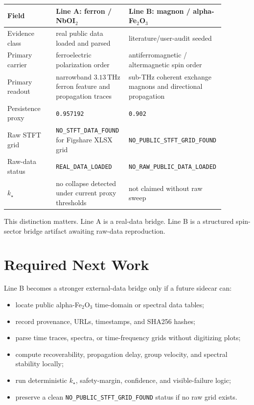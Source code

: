\documentclass[11pt]{article}
\begin{document}
\begin{longtable}{p{0.22\linewidth}p{0.33\linewidth}p{0.33\linewidth}}
\toprule
Field & Line A: ferron / NbOI$_2$ & Line B: magnon / alpha-Fe$_2$O$_3$ \\
\midrule
\endhead
Evidence class & real public data loaded and parsed & literature/user-audit seeded \\
Primary carrier & ferroelectric polarization order & antiferromagnetic / altermagnetic spin order \\
Primary readout & narrowband \(3.13\,\mathrm{THz}\) ferron feature and propagation traces & sub-THz coherent exchange magnons and directional propagation \\
Persistence proxy & \texttt{0.957192} & \texttt{0.902} \\
Raw STFT grid & \texttt{NO\_STFT\_DATA\_FOUND} for Figshare XLSX grid & \texttt{NO\_PUBLIC\_STFT\_GRID\_FOUND} \\
Raw-data status & \texttt{REAL\_DATA\_LOADED} & \texttt{NO\_RAW\_PUBLIC\_DATA\_LOADED} \\
\(k_\star\) & no collapse detected under current proxy thresholds & not claimed without raw sweep \\
\bottomrule
\end{longtable}

This distinction matters. Line A is a real-data bridge. Line B is a structured
spin-sector bridge artifact awaiting raw-data reproduction.

\section{Required Next Work}

Line B becomes a stronger external-data bridge only if a future sidecar can:

\begin{itemize}
\item locate public alpha-Fe$_2$O$_3$ time-domain or spectral data tables;
\item record provenance, URLs, timestamps, and SHA256 hashes;
\item parse time traces, spectra, or time-frequency grids without digitizing plots;
\item compute recoverability, propagation delay, group velocity, and spectral stability locally;
\item run deterministic \(k_\star\), safety-margin, confidence, and visible-failure logic;
\item preserve a clean \texttt{NO\_PUBLIC\_STFT\_GRID\_FOUND} status if no raw grid exists.
\end{itemize}
\end{document}
